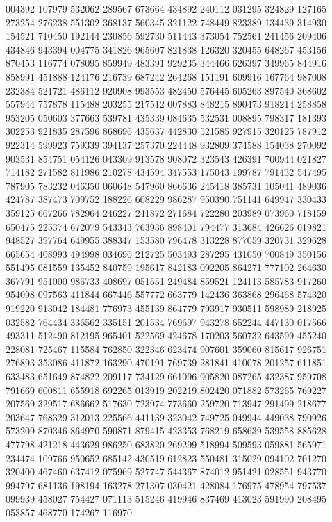 {004392 107979 532062 289567 673664 434892 240112 031295 324829 127165 273254%
276238 551302 368137 560345 321122 748449 823389 134439 314930 154521 710450%
192144 230856 592730 511443 373054 752561 241456 209406 434846 943394 004775%
341826 965607 821838 126320 320455 648267 453156 870453 116774 078095 859949%
483391 929235 344466 626397 349965 844916 858991 451888 124176 216739 687242%
264268 151191 609916 167764 987008 232384 521721 486112 920908 993553 482450%
576445 605263 897540 368602 557944 757878 115488 203255 217512 007883 848215%
890473 918214 258858 953205 050603 377663 539781 435339 084635 532531 008895%
798317 181393 302253 921835 287596 868696 435637 442830 521585 927915 320125%
787912 922314 599923 759339 394137 257370 224448 932809 374588 154038 270092%
903531 854751 054126 043309 913578 908072 323543 426391 700944 021827 714182%
271582 811986 210278 434594 347553 175043 199787 791432 547495 787905 783232%
046350 060648 547960 866636 245418 385731 105041 489036 424787 387473 709752%
188226 608229 986287 950390 751141 649947 330433 359125 667266 782964 246227%
241872 271684 722280 203989 073960 718159 650475 225374 672079 543343 763936%
898401 794477 313684 426626 019821 948527 397764 649955 388347 153580 796478%
313228 877059 320731 329628 665654 408993 494998 034696 212725 503493 287295%
431050 700849 350156 551495 081559 135452 840759 195617 842183 092205 864271%
777102 264630 367791 951000 986733 408697 051551 249484 859521 124113 585783%
917260 954098 097563 411844 667446 557772 663779 142436 363868 296468 574320%
919220 913042 184481 776973 455139 864779 793917 930511 598989 218925 032582%
764434 336562 335151 201534 769697 943278 652244 447130 017566 493311 512490%
812195 965401 522569 424678 170203 560732 643599 455240 228081 725467 115584%
762850 322346 623474 907601 359060 815617 926751 276893 353086 411872 163290%
470191 769739 281841 410078 201257 611851 633483 651649 874822 209117 734129%
661096 905820 087265 432387 959708 791669 600811 655918 692265 013919 202219%
802420 071882 573265 769227 207569 329517 686662 517630 723974 773660 259720%
713947 291499 218677 203647 768329 312013 225566 441139 323042 749725 049944%
449038 790926 573209 870346 864970 590871 879415 423353 768219 658639 539558%
885628 477798 421218 443629 986250 683820 269299 518994 509593 059881 565971%
234474 109766 950652 685142 430519 612823 550481 315029 094102 701270 320400%
467460 637412 075969 527747 544367 874012 951421 028551 943770 994797 681136%
198194 163278 271307 030421 428084 176975 478954 797537 099939 458027 754427%
071113 515246 419946 837469 413023 591990 208495 053857 468770 174267 116970%
}
